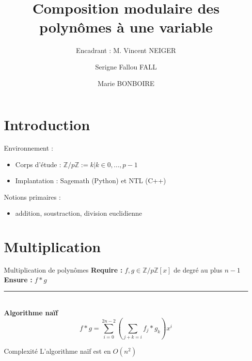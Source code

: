 \documentclass[10pt,a4paper]{beamer}
\institute{Sorbonne Université}
\title[Center text]{\textbf{Composition modulaire des polynômes à une variable}}
\subtitle{\small{Encadrant : M. Vincent NEIGER}}
\author{Serigne Fallou FALL \and Marie BONBOIRE}
\date{}
\begin{document}
\begin{frame}[plain]
    \titlepage
\end{frame}


\section{Introduction}
\begin{frame}
    \tableofcontents[currentsection]
\end{frame}

\begin{frame}
    Environnement :
    \begin{itemize}
        \item Corps d'étude : $\mathbb{Z}/p\mathbb{Z} := {k | k\in{0, ..., p-1}}$
        \item Implantation : Sagemath (Python) et NTL (C++)  
    \end{itemize}

    Notions primaires :
    \begin{itemize}
        \item addition, soustraction, division euclidienne
    \end{itemize}
\end{frame}

\section{Multiplication}
\begin{frame}
    \tableofcontents[currentsection]
\end{frame}

\begin{frame}
    \begin{block}{Multiplication de polynômes}
        \textbf{Require :} $f,g \in \mathbb{Z}/p\mathbb{Z}[x]$ de degré au plus $n-1$ \\
        \textbf{Ensure :} $f*g$
    \end{block}
    \rule{\linewidth}{0.2mm}\\[0.5cm]
    \textbf{Algorithme naïf}
    \[
    f*g=\sum_{i=0}^{2n-2} (\sum_{j+k=i}f_j*g_k) x^i
    \]

    \begin{alertblock}{Complexité}
        L'algorithme naïf est en $O(n^2)$
    \end{alertblock}

\end{frame}
\end{document}
